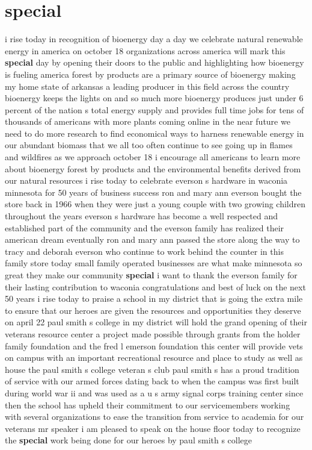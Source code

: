 \documentclass{article}
\begin{document}
\section*{special}
i rise today in recognition of bioenergy day a day we celebrate natural renewable energy in america on october 18 organizations across america will mark this {\bf \color{red} special} day by opening their doors to the public and highlighting how bioenergy is fueling america forest by products are a primary source of bioenergy making my home state of arkansas a leading producer in this field across the country bioenergy keeps the lights on and so much more bioenergy produces just under 6 percent of the nation s total energy supply and provides full time jobs for tens of thousands of americans with more plants coming online in the near future we need to do more research to find economical ways to harness renewable energy in our abundant biomass that we all too often continue to see going up in flames and wildfires as we approach october 18 i encourage all americans to learn more about bioenergy forest by products and the environmental benefits derived from our natural resources
\vspace{8mm}
i rise today to celebrate everson s hardware in waconia minnesota for 50 years of business success ron and mary ann everson bought the store back in 1966 when they were just a young couple with two growing children throughout the years everson s hardware has become a well respected and established part of the community and the everson family has realized their american dream eventually ron and mary ann passed the store along the way to tracy and deborah everson who continue to work behind the counter in this family store today small family operated businesses are what make minnesota so great they make our community {\bf \color{red} special} i want to thank the everson family for their lasting contribution to waconia congratulations and best of luck on the next 50 years
\vspace{8mm}
i rise today to praise a school in my district that is going the extra mile to ensure that our heroes are given the resources and opportunities they deserve on april 22 paul smith s college in my district will hold the grand opening of their veterans resource center a project made possible through grants from the holder family foundation and the fred l emerson foundation this center will provide vets on campus with an important recreational resource and place to study as well as house the paul smith s college veteran s club paul smith s has a proud tradition of service with our armed forces dating back to when the campus was first built during world war ii and was used as a u s army signal corps training center since then the school has upheld their commitment to our servicemembers working with several organizations to ease the transition from service to academia for our veterans mr speaker i am pleased to speak on the house floor today to recognize the {\bf \color{red} special} work being done for our heroes by paul smith s college\pagebreak
\end{document}
